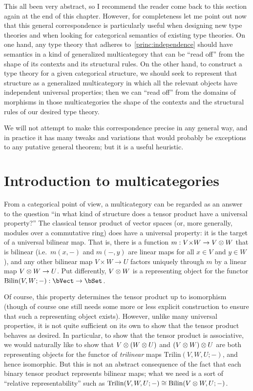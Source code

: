 This all been very abstract, so I recommend the reader come back to this section again at the end of this chapter.
However, for completeness let me point out now that this general correspondence is particularly useful when designing new type theories and when looking for categorical semantics of existing type theories.
On one hand, any type theory that adheres to~\eqref{princ:independence} should have semantics in a kind of generalized multicategory that can be ``read off'' from the shape of its contexts and its structural rules.
On the other hand, to construct a type theory for a given categorical structure, we should seek to represent that structure as a generalized multicategory in which all the relevant objects have independent universal properties; then we can ``read off'' from the domains of morphisms in those multicategories the shape of the contexts and the structural rules of our desired type theory.

We will not attempt to make this correspondence precise in any general way, and in practice it has many tweaks and variations that would probably be exceptions to any putative general theorem; but it is a useful heuristic.


\section{Introduction to multicategories}
\label{sec:multicats-catth}

From a categorical point of view, a multicategory can be regarded as an answer to the question ``in what kind of structure does a tensor product have a universal property?''
The classical tensor product of vector spaces (or, more generally, modules over a commutative ring) does have a universal property: it is the target of a universal bilinear map.
That is, there is a function $m:V\times W \to V\tensor W$ that is bilinear (i.e.\ $m(x,-)$ and $m(-,y)$ are linear maps for all $x\in V$ and $y\in W$), and any other bilinear map $V\times W \to U$ factors uniquely through $m$ by a linear map $V\otimes W \to U$.
Put differently, $V\otimes W$ is a representing object for the functor $\mathrm{Bilin}(V,W;-) : \bVect \to \bSet$.

Of course, this property determines the tensor product up to isomorphism (though of course one still needs some more or less explicit construction to ensure that such a representing object exists).
However, unlike many universal properties, it is not quite sufficient on its own to show that the tensor product behaves as desired.
In particular, to show that the tensor product is associative, we would naturally like to show that $V\otimes (W\otimes U)$ and $(V\otimes W)\otimes U$ are both representing objects for the functor of \emph{trilinear} maps $\mathrm{Trilin}(V,W,U;-)$, and hence isomorphic.
But this is not an abstract consequence of the fact that each binary tensor product represents bilinear maps;
what we need is a sort of ``relative representability'' such as $\mathrm{Trilin}(V,W,U;-) \cong \mathrm{Bilin}(V\otimes W,U;-)$.

